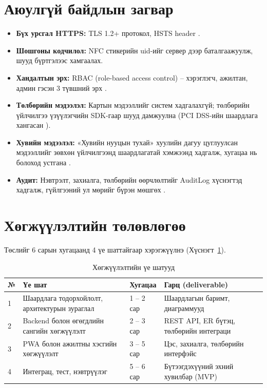 \section{Аюулгүй байдлын загвар}

\begin{itemize}
  \item \textbf{Бүх урсгал HTTPS:} TLS 1.2+ протокол, HSTS header
        \cite{rfc9110}.
  \item \textbf{Шошгоны кодчилол:} NFC стикерийн uid-ийг сервер дээр
        баталгаажуулж, шууд бүртгэлээс хамгаалах.
  \item \textbf{Хандалтын эрх:} RBAC (role-based access control) --
        хэрэглэгч, ажилтан, админ гэсэн 3 түвшний эрх
        \cite{owasp}.
  \item \textbf{Төлбөрийн мэдээлэл:} Картын мэдээллийг систем
        хадгалахгүй; төлбөрийн үйлчилгээ үзүүлэгчийн SDK-гаар
        шууд дамжуулна (PCI DSS-ийн шаардлага хангасан \cite{pcidss}).
  \item \textbf{Хувийн мэдээлэл:} «Хувийн нууцын тухай» хуулийн
        дагуу цуглуулсан мэдээллийг зөвхөн үйлчилгээнд шаардлагатай хэмжээнд хадгалж, хугацаа нь болоход устгана
        \cite{privacylaw}.
  \item \textbf{Аудит:} Нэвтрэлт, захиалга, төлбөрийн өөрчлөлтийг
        AuditLog хүснэгтэд хадгалж, гүйлгээний ул мөрийг бүрэн
        мөшгөх \cite{iso27001}.
\end{itemize}

\section{Хөгжүүлэлтийн төлөвлөгөө}

Төслийг 6 сарын хугацаанд 4 үе шаттайгаар хэрэгжүүлнэ
(Хүснэгт~\ref{tab:ch5-tolovlogoo}).

\begin{table}[h]
  \centering
  \caption{Хөгжүүлэлтийн үе шатууд}
  \label{tab:ch5-tolovlogoo}
  \small
  \begin{tabular}{@{}p{1.0cm}p{4.6cm}p{3.6cm}p{4.0cm}@{}}
    \toprule
    \textbf{№} & \textbf{Үе шат} & \textbf{Хугацаа} & \textbf{Гарц (deliverable)} \\
    \midrule
    1 & Шаардлага тодорхойлолт, архитектурын зураглал & 1 -- 2 сар &
    Шаардлагын баримт, диаграммууд \\
    2 & Backend болон өгөгдлийн сангийн хөгжүүлэлт & 2 -- 3 сар &
    REST API, ER бүтэц, төлбөрийн интеграци \\
    3 & PWA болон ажилтны хэсгийн хөгжүүлэлт & 3 -- 5 сар &
    Цэс, захиалга, төлбөрийн интерфэйс \\
    4 & Интеграц, тест, нэвтрүүлэг & 5 -- 6 сар &
    Бүтээгдэхүүний эхний хувилбар (MVP) \\
    \bottomrule
  \end{tabular}
\end{table}

